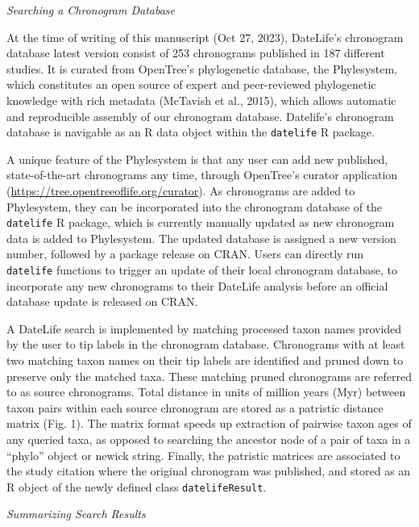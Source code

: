 \documentclass[english,man]{apa6}
\begin{document}
\begin{center}
\emph{Searching a Chronogram Database}
\end{center}

At the time of writing of this manuscript
(Oct 27, 2023),
DateLife's chronogram database latest version consist of 253 chronograms published in 187 different studies. It is curated from OpenTree's phylogenetic database, the Phylesystem, which constitutes an open source of expert and peer-reviewed phylogenetic knowledge with rich metadata (McTavish et al., 2015), which allows automatic and reproducible assembly of our chronogram database. Datelife's chronogram database is navigable as an R data object within the \texttt{datelife} R package.

A unique feature of the Phylesystem is that any user can add new published, state-of-the-art chronograms any time, through OpenTree's curator application (\url{https://tree.opentreeoflife.org/curator}). As chronograms are added to Phylesystem, they can be incorporated into the chronogram database of the \texttt{datelife} R package, which is currently manually updated as new chronogram data is added to Phylesystem. The updated database is assigned a new version number, followed by a package release on CRAN.
Users can directly run \texttt{datelife} functions to trigger an update of their local chronogram database, to incorporate any new chronograms to their DateLife analysis before an official database update is released on CRAN.

A DateLife search is implemented by matching processed taxon names provided by the user to tip labels in the chronogram database. Chronograms with at least two matching taxon names on their tip labels are identified and pruned down to preserve only the matched taxa.
These matching pruned chronograms are referred to as source chronograms.
Total distance in units of million years (Myr) between taxon pairs within each source chronogram are stored as a patristic distance matrix (Fig. 1).
The matrix format speeds up extraction of pairwise taxon ages of any queried taxa, as opposed to searching the ancestor node of a pair of taxa in a \enquote{phylo} object or newick string.
Finally, the patristic matrices are associated to the study citation where the original chronogram was published, and stored as an R object of the newly defined class \texttt{datelifeResult}.

\begin{center}
\emph{Summarizing Search Results}
\end{center}
\end{document}
